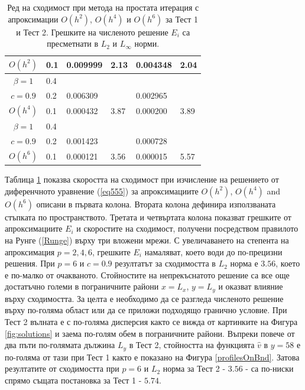 \documentclass{article}
\newcommand{\rf}[1]{(\ref{#1})}
\theoremstyle{remark}
\begin{document}
\begin{table}[ht]
\begin{tabular}{||c|l|ll|ll||}
     $O(h^2)$	&0.1  & 0.009999 & 2.13       & 0.004348      & 2.04  \\
\hline 	
 $\beta = 1$   	&0.4  &            &               &               &     \\
     $c=0.9$  	&0.2   & 0.006309  &              & 0.002965      &        \\
     $O(h^4)$	&0.1  &  0.000432 &3.87        & 0.000200 &  3.89        \\
    \hline
 $\beta = 1$	&0.4   &             &        &               &        \\
   $ c=0.9$  	&0.2   &  0.001423  &        & 0.000728      &       \\
       $O(h^6)$	&0.1  &   0.000121 &3.56  & 0.000015 &   5.57       \\
	   \hline
			\hline 
		\end{tabular}
		\caption{Ред на сходимост при метода на простата итерация с апроксимации $O(h^{2})$, $O(h^{4})$ и $O(h^{6})$ за Тест  1 и Тест 2. Грешките на численото решение $E_i$ са пресметнати в $L_2$ и $L_\infty$ норми.}
\label{tab:a}
\end{table}
\FloatBarrier
Таблица \ref{tab:a} показва скоростта на сходимост при изчисление на решението от диференчното уравнение \rf{eq555} за апроксимациите $O(h^{2})$, $O(h^{4})$ and $O(h^{6})$ описани в първата колона. Втората колона дефинира използваната стъпката по пространството. Третата и четвъртата колона показват грешките от апроксимациите $E_i$ и скоростите на сходимост, получени посредством правилото на Рунге \rf{Runge} върху три вложени мрежи. С увеличаването на степента на апроксимация $p=2,4,6$, грешките $E_i$ намаляват, което води до по-прецизни решения. При $p=6$ и $c=0.9$ резултатът за сходимостта в $L_2$ норма е $3.56$, което е по-малко от очакваното. Стойностите на непрекъснатото решение са все още достатъчно големи в пограничните райони $x=L_x$, $y=L_y$ и оказват влияние върху сходимостта. За целта е необходимо да се разгледа численото решение върху по-голяма област или да се приложи подходящо гранично условие.  При Тест 2 вълната е с по-голяма дисперсия както се вижда от картинките на Фигура \ref{fig:solutions} и заема по-голям обем в пограничните райони. Въпреки повече от два пъти по-голямата дължина $L_y$ в Тест 2, стойността на функцията $\widehat v$ в $y=58$ е по-голяма от тази при Тест 1 както е показано на Фигура \ref{profilesOnBnd}. Затова резултатите от сходимостта при $p=6$ и $L_2$ норма за Тест 2 - $3.56$ - са по-ниски спрямо същата постановка за Тест 1 - $5.74$.
\end{document}
